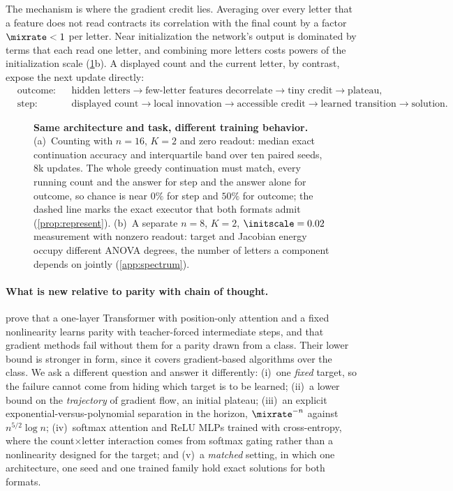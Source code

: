The mechanism is where the gradient credit lies. Averaging over every letter that a feature does not read contracts its correlation with
the final count by a factor $\mixrate<1$ per letter. Near initialization the network's output is dominated by terms that each read one
letter, and combining more letters costs powers of the initialization scale (\cref{fig:overview}b). A displayed count and the current
letter, by contrast, expose the next update directly:
{\small
\[
\begin{aligned}
 &\text{outcome:}&&\text{hidden letters}\to\text{few-letter features decorrelate}\to\text{tiny credit}\to\text{plateau},\\
 &\text{step:}&&\text{displayed count}\to\text{local innovation}\to\text{accessible credit}\to\text{learned transition}\to\text{solution}.
\end{aligned}
\]
}

\begin{figure}[t]
\centering

\caption{\textbf{Same architecture and task, different training behavior.}
(a)~Counting with $n=16$, $K=2$ and zero readout: median exact continuation accuracy and interquartile band over ten paired seeds, $8$k
updates. The whole greedy continuation must match, every running count and the answer for step and the answer alone for outcome,
so chance is near $0\%$ for step and $50\%$ for outcome; the dashed line marks the exact executor that both formats admit (\cref{prop:represent}).
(b)~A separate $n=8$, $K=2$, $\initscale=0.02$ measurement with nonzero readout: target and Jacobian energy occupy different ANOVA degrees, the number of letters a component depends on jointly (\cref{app:spectrum}).}
\label{fig:overview}
\end{figure}

\paragraph{What is new relative to parity with chain of thought.} \citet{kim2024parity} prove that a one-layer Transformer with
position-only attention and a fixed nonlinearity learns parity with teacher-forced intermediate steps, and that gradient methods fail
without them for a parity drawn from a class. Their lower bound is stronger in form, since it covers gradient-based algorithms over the
class. We ask a different question and answer it differently: (i)~one \emph{fixed} target, so the failure cannot come from hiding which
target is to be learned; (ii)~a lower bound on the \emph{trajectory} of gradient flow, an initial plateau; (iii)~an explicit
exponential-versus-polynomial separation in the horizon, $\mixrate^{-n}$ against $n^{5/2}\log n$; (iv)~softmax attention and ReLU MLPs
trained with cross-entropy, where the count$\times$letter interaction comes from softmax gating rather than a nonlinearity designed
for the target; and (v)~a \emph{matched} setting, in which one architecture, one seed and one trained family hold exact
solutions for both formats.

